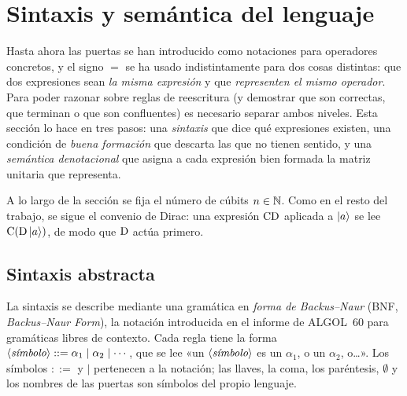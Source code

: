 \section{Sintaxis y semántica del lenguaje}
\label{sec:sintaxis-semantica}

Hasta ahora las puertas se han introducido como notaciones para operadores concretos, y el signo $=$ se ha usado indistintamente para dos cosas distintas: que dos expresiones sean \emph{la misma expresión} y que \emph{representen el mismo operador}. Para poder razonar sobre reglas de reescritura (y demostrar que son correctas, que terminan o que son confluentes) es necesario separar ambos niveles. Esta sección lo hace en tres pasos: una \emph{sintaxis} que dice qué expresiones existen, una condición de \emph{buena formación} que descarta las que no tienen sentido, y una \emph{semántica denotacional} que asigna a cada expresión bien formada la matriz unitaria que representa.

A lo largo de la sección se fija el número de cúbits $n\in\mathbb{N}$. Como en el resto del trabajo, se sigue el convenio de Dirac: una expresión $\text{C}\text{D}$ aplicada a $\ket{a}$ se lee $\text{C}(\text{D}\ket{a})$, de modo que $\text{D}$ actúa primero.

\subsection{Sintaxis abstracta}

La sintaxis se describe mediante una gramática en \emph{forma de Backus--Naur} (BNF, \emph{Backus--Naur Form}), la notación introducida en el informe de ALGOL~60 para gramáticas libres de contexto. Cada regla tiene la forma $\langle\textit{símbolo}\rangle ::= \alpha_1 \mid \alpha_2 \mid \cdots$, que se lee «un $\langle\textit{símbolo}\rangle$ es un $\alpha_1$, o un $\alpha_2$, o\ldots». Los símbolos $::=$ y $\mid$ pertenecen a la notación; las llaves, la coma, los paréntesis, $\emptyset$ y los nombres de las puertas son símbolos del propio lenguaje.

